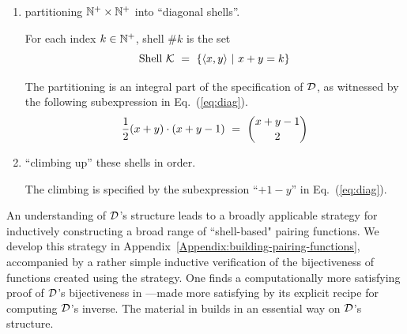\begin{enumerate}
\item
partitioning $\mathbb{N}^+ \times \mathbb{N}^+$ into ``diagonal shells''.

\smallskip

For each index $k \in \mathbb{N}^+$, shell \#$k$ is the set
\[ \mbox{Shell } \mbox{$\cal K$} \ = \ \{ \langle x,y \rangle \ | \ x+y = k \} \]

\smallskip

The partitioning is an integral part of the specification of $\mbox{$\cal D$}$, as witnessed by the following subexpression in Eq.~(\ref{eq:diag}).
\[ {1 \over 2} (x+y) \cdot (x+y-1) \ = \ {{x+y-1} \choose 2} \]

\medskip\item
``climbing up'' these shells in order.

\smallskip

The climbing is specified by the subexpression ``$+1-y$'' in Eq.~(\ref{eq:diag}).
\end{enumerate}
\bigskip

\noindent {}

\bigskip

An understanding of $\mbox{$\cal D$}$'s structure leads to a broadly applicable strategy for inductively constructing a broad range of ``shell-based" pairing functions.  We develop this strategy in Appendix~\ref{Appendix:building-pairing-functions}, accompanied by a rather simple inductive verification of the bijectiveness of functions created using the strategy.  One finds a computationally more satisfying proof of $\mbox{$\cal D$}$'s bijectiveness in \cite{Davis58}---made more satisfying by its explicit recipe for computing $\mbox{$\cal D$}$'s inverse.  The material in \cite{Davis58} builds in an essential way on $\mbox{$\cal D$}$'s structure.

\bigskip

